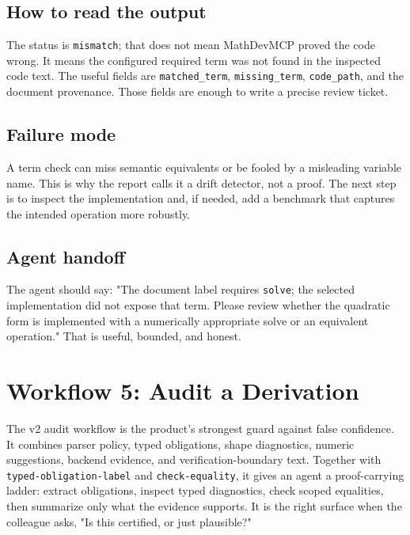 \documentclass[12pt,a4paper,openany]{book}
\begin{document}


\section*{How to read the output}

The status is \texttt{mismatch}; that does not mean MathDevMCP proved the code
wrong. It means the configured required term was not found in the inspected code
text. The useful fields are \texttt{matched\_term}, \texttt{missing\_term},
\texttt{code\_path}, and the document provenance. Those fields are enough to
write a precise review ticket.

\section*{Failure mode}

A term check can miss semantic equivalents or be fooled by a misleading
variable name. This is why the report calls it a drift detector, not a proof.
The next step is to inspect the implementation and, if needed, add a benchmark
that captures the intended operation more robustly.

\section*{Agent handoff}

The agent should say: "The document label requires \texttt{solve}; the selected
implementation did not expose that term. Please review whether the quadratic
form is implemented with a numerically appropriate solve or an equivalent
operation." That is useful, bounded, and honest.

\chapter{Workflow 5: Audit a Derivation}

The v2 audit workflow is the product's strongest guard against false confidence.
It combines parser policy, typed obligations, shape diagnostics, numeric
suggestions, backend evidence, and verification-boundary text. Together with
\texttt{typed-obligation-label} and \texttt{check-equality}, it gives an agent a
proof-carrying ladder: extract obligations, inspect typed diagnostics, check
scoped equalities, then summarize only what the evidence supports. It is the
right surface when the colleague asks, "Is this certified, or just plausible?"
\end{document}
